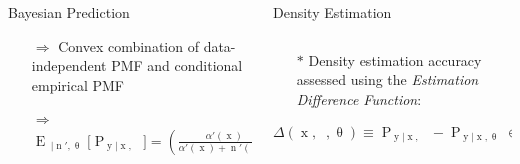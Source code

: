 \documentclass[xcolor=dvipsnames]{beamer}
\DeclareMathOperator{\xrm}{\mathrm{x}}
\DeclareMathOperator{\yrm}{\mathrm{y}}
\DeclareMathOperator{\nrm}{\mathrm{n}}
\DeclareMathOperator{\nbarrm}{\bar{\mathrm{n}}}
\DeclareMathOperator{\Prm}{\mathrm{P}}
\DeclareMathOperator{\Erm}{\mathrm{E}}
\DeclareMathOperator{\Ycal}{\mathcal{Y}}
\DeclareMathOperator{\Rbb}{\mathbb{R}}
\begin{document}
\begin{frame}{}
\begin{columns}[T]
\begin{column}{.34\linewidth}
\begin{block}{Bayesian Prediction}
\vspace{1cm}

\begin{itemize}
\item[$\Rightarrow$] Convex combination of data-independent PMF and conditional empirical PMF
\item[$\Rightarrow$] $\Erm_{\nbarrm | \nrm',\uptheta}\big[ \Prm_{\yrm | \xrm,\nbarrm} \big] = \left(\frac{\alpha'(\xrm)}{\alpha'(\xrm) + \nrm'(\xrm)}\right) \frac{\alpha(\cdot,\xrm)}{\alpha'(\xrm)} + \left(\frac{\nrm'(\xrm)}{\alpha'(\xrm) + \nrm'(\xrm)}\right) \tilde{\uptheta}(\xrm)$
\end{itemize}



\end{block}  
    
\end{column}





\begin{column}{.34\linewidth}
      
\begin{block}{Density Estimation}

\begin{columns}[c]
\begin{column}{.53\linewidth}

\begin{itemize}
\item[$*$] Density estimation accuracy assessed using the \emph{Estimation Difference Function}:
\end{itemize}

\begin{equation*}
\Delta(\xrm,\nbarrm,\uptheta) \equiv \Prm_{\yrm | \xrm,\nbarrm} - \Prm_{\yrm | \xrm,\uptheta} \in \Rbb^{\Ycal}
\end{equation*}

\vspace{1cm}


\end{column}
\end{columns}
\end{block}
\end{column}
\end{columns}
\end{frame}
\end{document}
